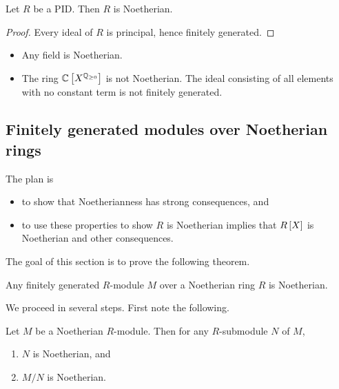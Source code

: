 
\begin{corollary}
Let $ R $ be a PID. Then $ R $ is Noetherian.
\end{corollary}

\begin{proof}
Every ideal of $ R $ is principal, hence finitely generated.
\end{proof}

\begin{example*}
\hfill
\begin{itemize}
\item Any field is Noetherian.
\item The ring $ \CC\sbr{X^{\QQ_{\ge 0}}} $ is not Noetherian. The ideal consisting of all elements with no constant term is not finitely generated.
\end{itemize}
\end{example*}

\subsection{Finitely generated modules over Noetherian rings}

The plan is
\begin{itemize}
\item to show that Noetherianness has strong consequences, and
\item to use these properties to show $ R $ is Noetherian implies that $ R\sbr{X} $ is Noetherian and other consequences.
\end{itemize}
The goal of this section is to prove the following theorem.

\begin{theorem}
\label{thm:8.2.1}
Any finitely generated $ R $-module $ M $ over a Noetherian ring $ R $ is Noetherian.
\end{theorem}

\pagebreak

We proceed in several steps. First note the following.

\begin{proposition}
Let $ M $ be a Noetherian $ R $-module. Then for any $ R $-submodule $ N $ of $ M $,
\begin{enumerate}
\item $ N $ is Noetherian, and
\item $ M / N $ is Noetherian.
\end{enumerate}
\end{proposition}


